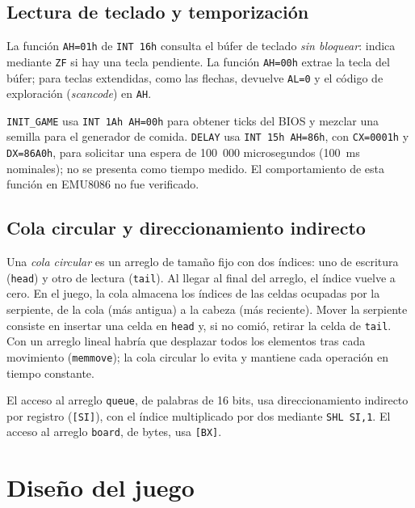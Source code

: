 \documentclass[10pt]{article}
\begin{document}
\subsection{Lectura de teclado y temporización}
La función \texttt{AH=01h} de \texttt{INT 16h} consulta el búfer de teclado \emph{sin bloquear}: indica mediante \texttt{ZF} si hay una tecla pendiente. La función \texttt{AH=00h} extrae la tecla del búfer; para teclas extendidas, como las flechas, devuelve \texttt{AL=0} y el código de exploración (\emph{scancode}) en \texttt{AH}.

\texttt{INIT\_GAME} usa \texttt{INT 1Ah AH=00h} para obtener ticks del BIOS y mezclar una semilla para el generador de comida. \texttt{DELAY} usa \texttt{INT 15h AH=86h}, con \texttt{CX=0001h} y \texttt{DX=86A0h}, para solicitar una espera de 100~000 microsegundos (100~ms nominales); no se presenta como tiempo medido. El comportamiento de esta función en EMU8086 no fue verificado.

\subsection{Cola circular y direccionamiento indirecto}
Una \textit{cola circular} es un arreglo de tamaño fijo con dos índices: uno de escritura (\texttt{head}) y otro de lectura (\texttt{tail}). Al llegar al final del arreglo, el índice vuelve a cero. En el juego, la cola almacena los índices de las celdas ocupadas por la serpiente, de la cola (más antigua) a la cabeza (más reciente). Mover la serpiente consiste en insertar una celda en \texttt{head} y, si no comió, retirar la celda de \texttt{tail}. Con un arreglo lineal habría que desplazar todos los elementos tras cada movimiento (\texttt{memmove}); la cola circular lo evita y mantiene cada operación en tiempo constante.

El acceso al arreglo \texttt{queue}, de palabras de 16 bits, usa direccionamiento indirecto por registro (\texttt{[SI]}), con el índice multiplicado por dos mediante \texttt{SHL SI,1}. El acceso al arreglo \texttt{board}, de bytes, usa \texttt{[BX]}.

\section{Diseño del juego}
\end{document}
